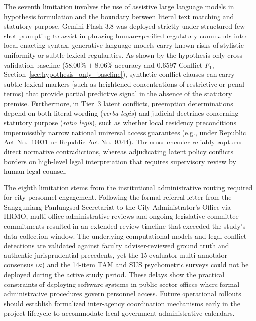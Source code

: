 The seventh limitation involves the use of assistive large language models in hypothesis formulation and the boundary between literal text matching and statutory purpose. Gemini Flash 3.8 was deployed strictly under structured few-shot prompting to assist in phrasing human-specified regulatory commands into local enacting syntax, generative language models carry known risks of stylistic uniformity or subtle lexical regularities. As shown by the hypothesis-only cross-validation baseline ($58.00\% \pm 8.06\%$ accuracy and 0.6597 Conflict $F_1$, Section~\ref{sec:hypothesis_only_baseline}), synthetic conflict clauses can carry subtle lexical markers (such as heightened concentrations of restrictive or penal terms) that provide partial predictive signal in the absence of the statutory premise. Furthermore, in Tier~3 latent conflicts, preemption determinations depend on both literal wording (\textit{verba legis}) and judicial doctrines concerning statutory purpose (\textit{ratio legis}), such as whether local residency preconditions impermissibly narrow national universal access guarantees (e.g., under Republic Act No.~10931 or Republic Act No.~9344). The cross-encoder reliably captures direct normative contradictions, whereas adjudicating latent policy conflicts borders on high-level legal interpretation that requires supervisory review by human legal counsel.

The eighth limitation stems from the institutional administrative routing required for city personnel engagement. Following the formal referral letter from the Sangguniang Panlungsod Secretariat to the City Administrator's Office via HRMO, multi-office administrative reviews and ongoing legislative committee commitments resulted in an extended review timeline that exceeded the study's data collection window. The underlying computational models and legal conflict detections are validated against faculty adviser-reviewed ground truth and authentic jurisprudential precedents, yet the 15-evaluator multi-annotator consensus ($\kappa$) and the 14-item TAM and SUS psychometric surveys could not be deployed during the active study period. These delays show the practical constraints of deploying software systems in public-sector offices where formal administrative procedures govern personnel access. Future operational rollouts should establish formalized inter-agency coordination mechanisms early in the project lifecycle to accommodate local government administrative calendars.

